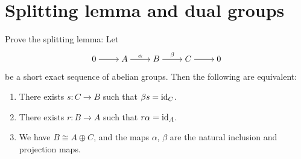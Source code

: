 \documentclass[11pt,a4paper]{article}
\begin{document}
\section{Splitting lemma and dual groups}
\begin{exercise}
  Prove the splitting lemma:
  Let
  \[\begin{tikzcd}[ampersand replacement=\&,cramped]
    0 \& A \& B \& C \& 0
    \arrow[from=1-1, to=1-2]
    \arrow["\alpha", from=1-2, to=1-3]
    \arrow["\beta", from=1-3, to=1-4]
    \arrow[from=1-4, to=1-5]
  \end{tikzcd}\]
  be a short exact sequence of abelian groups.
  Then the following are equivalent:
  \begin{enumerate}
    \item[(1)] There exists $s \colon C \to B$ such that $\beta s = \operatorname{id}_C$.
    \item[(2)] There exists $r \colon B \to A$ such that $r \alpha = \operatorname{id}_A$.
    \item[(3)] We have $B \cong A \oplus C$, and the maps $\alpha$, $\beta$
      are the natural inclusion and projection maps.
  \end{enumerate}
\end{exercise}
\end{document}
